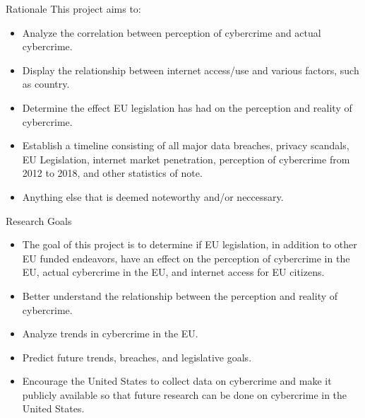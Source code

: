 \documentclass[aspectratio=32]{beamer}
\begin{document}
\begin{frame}{Rationale}
This project aims to:
    \begin{itemize}
        \item Analyze the correlation between perception of cybercrime and actual cybercrime.
        \item Display the relationship between internet access/use and various factors, such as country.
        \item Determine the effect EU legislation has had on the perception and reality of cybercrime.
        \item Establish a timeline consisting of all major data breaches, privacy scandals, EU Legislation, internet market penetration, perception of cybercrime from 2012 to 2018, and other statistics of note.
        \item Anything else that is deemed noteworthy and/or neccessary. 
    \end{itemize}
\end{frame}

\begin{frame}{Research Goals}
    \begin{itemize}
        \item The goal of this project is to determine if EU legislation, in addition to other EU funded endeavors, have an effect on the perception of cybercrime in the EU, actual cybercrime in the EU, and internet access for EU citizens. 
        \item Better understand the relationship between the perception and reality of cybercrime.
        \item Analyze trends in cybercrime in the EU. 
        \item Predict future trends, breaches, and legislative goals.
        \item Encourage the United States to collect data on cybercrime and make it publicly available so that future research can be done on cybercrime in the United States.
    \end{itemize}
\end{frame}
\end{document}
